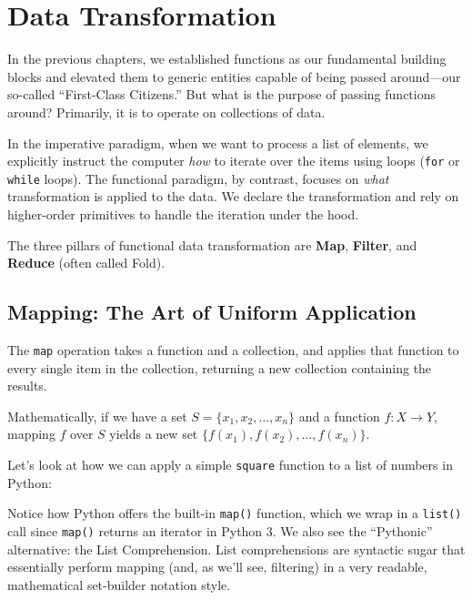 \chapter{Data Transformation}
\label{ch:datatransformation}

In the previous chapters, we established functions as our fundamental building blocks and elevated them to generic entities capable of being passed around—our so-called ``First-Class Citizens.'' But what is the purpose of passing functions around? Primarily, it is to operate on collections of data. 

In the imperative paradigm, when we want to process a list of elements, we explicitly instruct the computer \textit{how} to iterate over the items using loops (\texttt{for} or \texttt{while} loops). The functional paradigm, by contrast, focuses on \textit{what} transformation is applied to the data. We declare the transformation and rely on higher-order primitives to handle the iteration under the hood.

The three pillars of functional data transformation are \textbf{Map}, \textbf{Filter}, and \textbf{Reduce} (often called Fold).

\section{Mapping: The Art of Uniform Application}
The \texttt{map} operation takes a function and a collection, and applies that function to every single item in the collection, returning a new collection containing the results. 

Mathematically, if we have a set $S = \{x_1, x_2, \dots, x_n\}$ and a function $f: X \rightarrow Y$, mapping $f$ over $S$ yields a new set $\{f(x_1), f(x_2), \dots, f(x_n)\}$.

Let's look at how we can apply a simple \texttt{square} function to a list of numbers in Python:



Notice how Python offers the built-in \texttt{map()} function, which we wrap in a \texttt{list()} call since \texttt{map()} returns an iterator in Python 3. We also see the ``Pythonic'' alternative: the List Comprehension. List comprehensions are syntactic sugar that essentially perform mapping (and, as we'll see, filtering) in a very readable, mathematical set-builder notation style.

